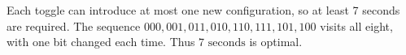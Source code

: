 Each toggle can introduce at most one new configuration, so at least 7 seconds are required. The sequence $000,001,011,010,110,111,101,100$ visits all eight, with one bit changed each time. Thus $\boxed7\text{ seconds}$ is optimal.
